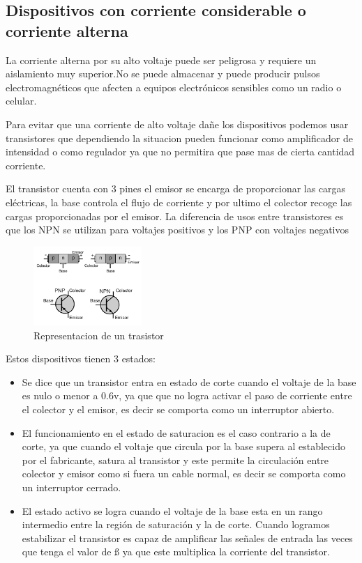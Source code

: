 \documentclass[a4paper]{article}
\begin{document}
\subsection*{Dispositivos con corriente considerable o corriente alterna}

La corriente alterna por su alto voltaje puede ser peligrosa y requiere un 
aislamiento muy superior.No se puede almacenar y puede producir pulsos 
electromagnéticos que afecten a equipos electrónicos sensibles como un radio
 o celular.

Para evitar que una corriente de alto voltaje dañe los dispositivos podemos
usar transistores que dependiendo la situacion pueden funcionar como amplificador
de intensidad o como regulador ya que no permitira que pase mas de cierta cantidad
corriente.

El transistor cuenta con 3 pines el emisor se encarga de proporcionar las cargas 
eléctricas, la base controla el flujo de corriente y por ultimo el colector recoge
las cargas proporcionadas por el emisor. La diferencia de usos entre transistores 
es que los NPN se utilizan para voltajes positivos y los PNP con voltajes negativos

\begin{figure}[h]\centering
    \includegraphics[height=3cm]{transistorilustrado.png}
    \caption{Representacion de un trasistor}\label{fig:transistorilustrado}
\end{figure}


Estos dispositivos tienen 3 estados:

\begin{itemize}
    \item {
	Se dice que un transistor entra en estado de corte cuando el voltaje
	de la base es nulo o menor a 0.6v, ya que que no logra activar el paso
	de corriente entre el colector y el emisor, es decir se comporta como 
	un interruptor abierto.
    }
    \item {
        El funcionamiento en el estado de saturacion es el caso contrario a la 
	de corte, ya que cuando el voltaje que circula por la base supera al 
	establecido por el fabricante, satura al transistor y este permite la
	 circulación entre colector y emisor como si fuera un cable normal,
	 es decir se comporta como un interruptor cerrado.
    }
    \item {
        El estado activo se logra cuando el voltaje de la base esta en un rango
	intermedio entre la región de saturación y la de corte. 
	Cuando logramos estabilizar el transistor es capaz de amplificar las 
	señales de entrada las veces que tenga el valor de ß ya que este 
	multiplica la corriente del transistor.
    }    
\end{itemize}
\end{document}

